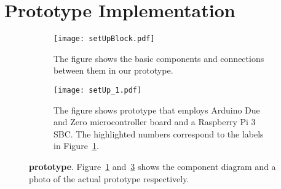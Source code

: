 \section{\name Prototype Implementation}
\label{sec:prototype}


\begin{figure}[t]
	\begin{center}
		\begin{subfigure}{0.4\textwidth}
		\centering
			\texttt{[image: setUpBlock.pdf]}
			\caption{The figure shows the basic components and connections between them in our \name prototype.}
			\label{fig:prototypeArch}	
		\end{subfigure}
	\end{center}
	
	
	\begin{center}
		\begin{subfigure}{0.4\textwidth}
		\centering
		\texttt{[image: setUp\_1.pdf]}
		\caption{The figure shows \name prototype that employs Arduino Due and Zero microcontroller board and a Raspberry Pi 3 SBC. The highlighted numbers correspond to the labels in Figure~\ref{fig:prototypeArch}.}
		\label{fig:prototype}
	\end{subfigure}
	\end{center}
	\vspace{-1em}
	\caption{\textbf{\name prototype}. Figure~\ref{fig:prototypeArch} and~\ref{fig:prototype} shows the component diagram and a photo of the actual \name prototype respectively.} 
\end{figure}


\iffalse
\begin{figure}[t]
\centering
\texttt{[image: setUpBlock.pdf]}
\caption{\textbf{\name prototype architecture}. }
\label{fig:prototypeArch}
\centering
\end{figure}


\begin{figure}[t]
\centering
\texttt{[image: setUp\_1.pdf]}
\caption{\textbf{\name prototype}. The figure shows \name prototype that employs Arduino Due and Zero microcontroller board and a Raspberry Pi 3 SBC. The highlighted numbers correspond to the labels in Figure~\ref{fig:prototypeArch}.}
\label{fig:prototype}
\centering
\end{figure}
\fi


